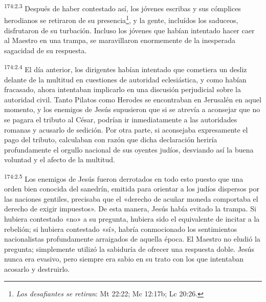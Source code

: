 \par 
\textsuperscript{174:2.3} Después de haber contestado así, los jóvenes escribas y sus cómplices herodianos se retiraron de su presencia\footnote{\textit{Los desafiantes se retiran}: Mt 22:22; Mc 12:17b; Lc 20:26.}, y la gente, incluídos los saduceos, disfrutaron de su turbación. Incluso los jóvenes que habían intentado hacer caer al Maestro en una trampa, se maravillaron enormemente de la inesperada sagacidad de su respuesta.

\par 
\textsuperscript{174:2.4} El día anterior, los dirigentes habían intentado que cometiera un desliz delante de la multitud en cuestiones de autoridad eclesiástica, y como habían fracasado, ahora intentaban implicarlo en una discusión perjudicial sobre la autoridad civil. Tanto Pilatos como Herodes se encontraban en Jerusalén en aquel momento, y los enemigos de Jesús supusieron que si se atrevía a aconsejar que no se pagara el tributo al César, podrían ir inmediatamente a las autoridades romanas y acusarlo de sedición. Por otra parte, si aconsejaba expresamente el pago del tributo, calculaban con razón que dicha declaración heriría profundamente el orgullo nacional de sus oyentes judíos, desviando así la buena voluntad y el afecto de la multitud.

\par 
\textsuperscript{174:2.5} Los enemigos de Jesús fueron derrotados en todo esto puesto que una orden bien conocida del sanedrín, emitida para orientar a los judíos dispersos por las naciones gentiles, precisaba que el «derecho de acuñar moneda comportaba el derecho de exigir impuestos». De esta manera, Jesús había evitado la trampa. Si hubiera contestado «no» a su pregunta, hubiera sido el equivalente de incitar a la rebelión; si hubiera contestado «sí», habría conmocionado los sentimientos nacionalistas profundamente arraigados de aquella época. El Maestro no eludió la pregunta; simplemente utilizó la sabiduría de ofrecer una respuesta doble. Jesús nunca era evasivo, pero siempre era sabio en su trato con los que intentaban acosarlo y destruirlo.

